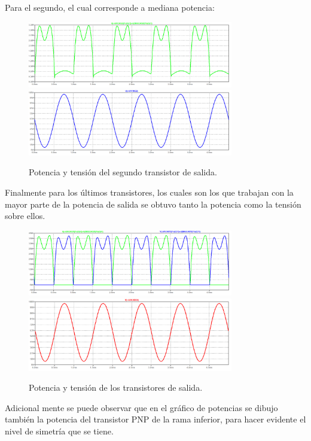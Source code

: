 Para el segundo, el cual corresponde a mediana potencia:
\begin{figure}[H]
	\centering
	\includegraphics[width=0.8\textwidth]{ImagenesSimulaciones/PO2.png}
		\includegraphics[width=0.8\textwidth]{ImagenesSimulaciones/VO2.png}
	\caption{Potencia y tensión del segundo transistor de salida.}
	\label{fig:po2}
\end{figure}
Finalmente para los últimos transistores, los cuales son los que trabajan con la mayor parte de la potencia de salida se obtuvo tanto la potencia como la tensión sobre ellos.
\begin{figure}[H]
	\centering
	\includegraphics[width=0.8\textwidth]{ImagenesSimulaciones/PO3.png}
		\includegraphics[width=0.8\textwidth]{ImagenesSimulaciones/VO3.png}
	\caption{Potencia y tensión de los transistores de salida.}
	\label{fig:po3}
\end{figure}
Adicional mente se puede observar que en el gráfico de potencias se dibujo también la potencia del transistor PNP de la rama inferior, para hacer evidente el nivel de simetría que se tiene.\\
